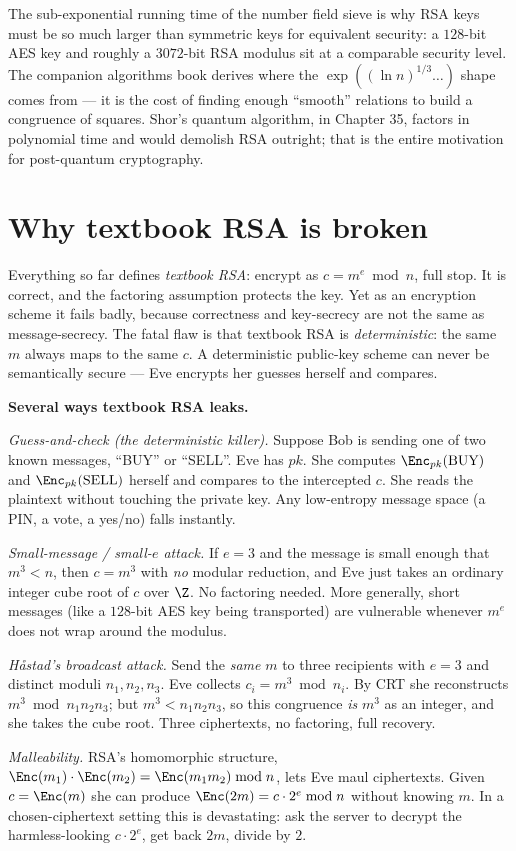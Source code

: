 \begin{connectionbox}
The sub-exponential running time of the number field sieve is why RSA keys must be so much larger than symmetric keys for equivalent security: a $128$-bit AES key and roughly a $3072$-bit RSA modulus sit at a comparable security level. The companion algorithms book derives where the $\exp((\ln n)^{1/3}\dots)$ shape comes from --- it is the cost of finding enough ``smooth'' relations to build a congruence of squares. Shor's quantum algorithm, in Chapter 35, factors in polynomial time and would demolish RSA outright; that is the entire motivation for post-quantum cryptography.
\end{connectionbox}

\section{Why textbook RSA is broken}
\label{ch19:textbook-broken}

Everything so far defines \emph{textbook RSA}: encrypt as $c=m^e\bmod n$, full stop. It is correct, and the factoring assumption protects the key. Yet as an encryption scheme it fails badly, because correctness and key-secrecy are not the same as message-secrecy. The fatal flaw is that textbook RSA is \emph{deterministic}: the same $m$ always maps to the same $c$. A deterministic public-key scheme can never be semantically secure --- Eve encrypts her guesses herself and compares.

\begin{attackbox}
\textbf{Several ways textbook RSA leaks.}

\emph{Guess-and-check (the deterministic killer).} Suppose Bob is sending one of two known messages, ``BUY'' or ``SELL''. Eve has $pk$. She computes $\Enc_{pk}(\text{BUY})$ and $\Enc_{pk}(\text{SELL})$ herself and compares to the intercepted $c$. She reads the plaintext without touching the private key. Any low-entropy message space (a PIN, a vote, a yes/no) falls instantly.

\emph{Small-message / small-$e$ attack.} If $e=3$ and the message is small enough that $m^3 < n$, then $c=m^3$ with \emph{no} modular reduction, and Eve just takes an ordinary integer cube root of $c$ over $\Z$. No factoring needed. More generally, short messages (like a $128$-bit AES key being transported) are vulnerable whenever $m^e$ does not wrap around the modulus.

\emph{H\r{a}stad's broadcast attack.} Send the \emph{same} $m$ to three recipients with $e=3$ and distinct moduli $n_1,n_2,n_3$. Eve collects $c_i = m^3\bmod n_i$. By CRT she reconstructs $m^3\bmod n_1 n_2 n_3$; but $m^3 < n_1 n_2 n_3$, so this congruence \emph{is} $m^3$ as an integer, and she takes the cube root. Three ciphertexts, no factoring, full recovery.

\emph{Malleability.} RSA's homomorphic structure, $\Enc(m_1)\cdot\Enc(m_2)=\Enc(m_1 m_2)\bmod n$, lets Eve maul ciphertexts. Given $c=\Enc(m)$ she can produce $\Enc(2m) = c\cdot 2^e\bmod n$ without knowing $m$. In a chosen-ciphertext setting this is devastating: ask the server to decrypt the harmless-looking $c\cdot 2^e$, get back $2m$, divide by $2$.
\end{attackbox}


